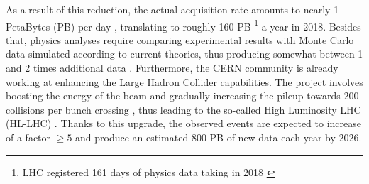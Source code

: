 As a result of this reduction, the actual acquisition rate
amounts to nearly 1 PetaBytes (PB) per day \cite{cern2017storage}, translating to roughly 160 PB%
\footnote{LHC registered 161 days of physics data taking in 2018 \cite{todd2018lhcAvail}}
a year in 2018. %
Besides that, physics analyses require comparing experimental results with Monte Carlo data simulated according to current theories, thus producing somewhat between 1 and 2 times additional data \cite{grandi2017HEPsize}.
Furthermore, the CERN community is already working at enhancing the Large Hadron Collider capabilities.
The project involves boosting the energy of the beam and gradually increasing the pileup towards 200 collisions per bunch crossing \cite{albrecht2019roadmap}, thus leading to the so-called High Luminosity LHC (HL-LHC) \cite{hllhc}.
Thanks to this upgrade, the observed events are expected to increase of a factor $\geq5$ \cite{hllhc} and produce an estimated 800 PB of new data each year by 2026.%

